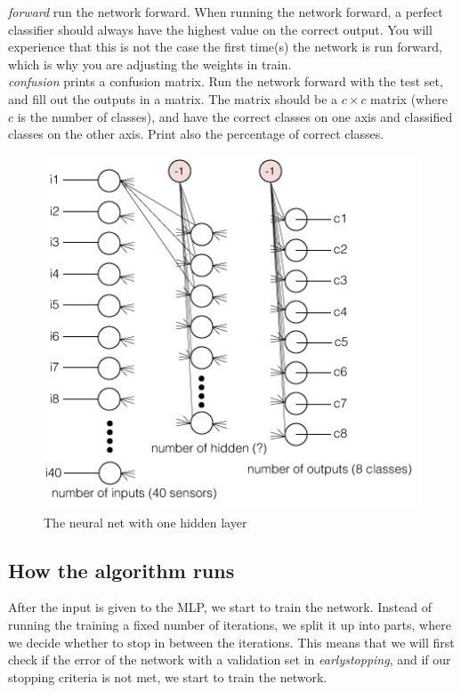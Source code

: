 \documentclass{article}           %
\begin{document}
\noindent \emph{forward} run the network forward. When running the network forward, a perfect classifier should always have the highest value on the correct output. You will experience that this is not the case the first time(s) the network is run forward, which is why you are adjusting the weights in train.\\

\noindent \emph{confusion} prints a confusion matrix. Run the network forward with the test set, and fill out the outputs in a matrix. The matrix should be a $c \times c$ matrix (where $c$ is the number of classes), and have the correct classes on one axis and classified classes on the other axis. Print also the percentage of correct classes.


\begin{figure}
    \centering
    \includegraphics[scale=0.5]{figures/neuralnet.png}
    \caption{The neural net with one hidden layer}
    \label{fig:awesome_image}
\end{figure}

\subsection*{How the algorithm runs}
After the input is given to the MLP, we start to train the network. Instead of running the training a fixed number of iterations, we split it up into parts, where we decide whether to stop in between the iterations. This means that we will first check if the error of the network with a validation set in \emph{earlystopping}, and if our stopping criteria is not met, we start to train the network.
\end{document}
